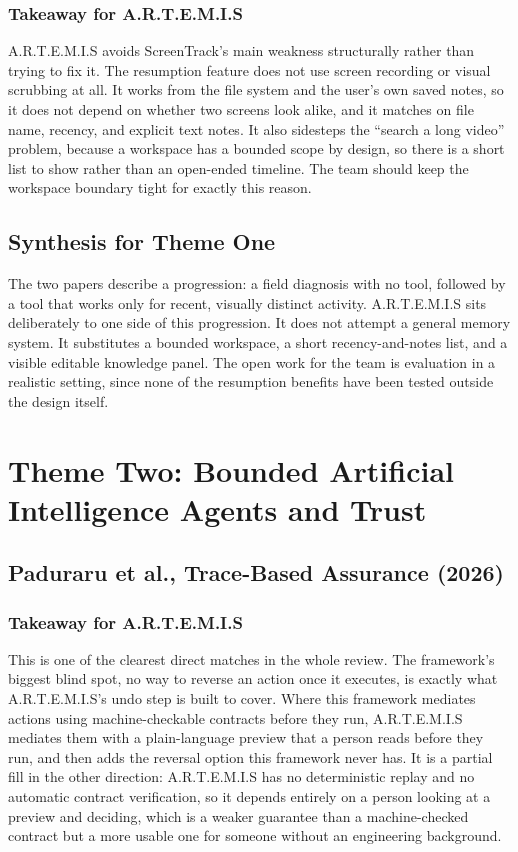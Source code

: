 \documentclass[11pt,a4paper]{report}
\newcommand{\artemis}{A.R.T.E.M.I.S}
\begin{document}
\subsubsection{Takeaway for \artemis{}}

\artemis{} avoids ScreenTrack's main weakness structurally rather than
trying to fix it. The resumption feature does not use screen recording
or visual scrubbing at all. It works from the file system and the
user's own saved notes, so it does not depend on whether two screens
look alike, and it matches on file name, recency, and explicit text
notes. It also sidesteps the \enquote{search a long video} problem,
because a workspace has a bounded scope by design, so there is a short
list to show rather than an open-ended timeline. The team should keep
the workspace boundary tight for exactly this reason.

\subsection{Synthesis for Theme One}

The two papers describe a progression: a field diagnosis with no tool,
followed by a tool that works only for recent, visually distinct
activity. \artemis{} sits deliberately to one side of this progression.
It does not attempt a general memory system. It substitutes a bounded
workspace, a short recency-and-notes list, and a visible editable
knowledge panel. The open work for the team is evaluation in a
realistic setting, since none of the resumption benefits have been
tested outside the design itself.

\section{Theme Two: Bounded Artificial Intelligence Agents and Trust}

\subsection{Paduraru et al., Trace-Based Assurance (2026)}

\subsubsection{Takeaway for \artemis{}}

This is one of the clearest direct matches in the whole review. The
framework's biggest blind spot, no way to reverse an action once it
executes, is exactly what \artemis{}'s undo step is built to cover.
Where this framework mediates actions using machine-checkable contracts
before they run, \artemis{} mediates them with a plain-language preview
that a person reads before they run, and then adds the reversal option
this framework never has. It is a partial fill in the other direction:
\artemis{} has no deterministic replay and no automatic contract
verification, so it depends entirely on a person looking at a preview
and deciding, which is a weaker guarantee than a machine-checked
contract but a more usable one for someone without an engineering
background.
\end{document}
